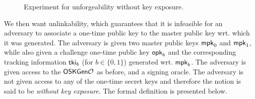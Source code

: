 \begin{figure}[!t]
    \centering
    \begin{pchstack}[boxed]
    \begin{pcvstack}
    

    \end{pcvstack}
    \pchspace
    
    \begin{pcvstack}
        
    \end{pcvstack}
    
    \end{pchstack}
    \caption{\small Experiment for unforgeability without key exposure.}
    \label{fig:experiment_forge_without_key_exposure}
\end{figure}

We then want unlinkability, which guarantees that it is infeasible for an adversary to associate a one-time public key to the master public key wrt. which it was generated.
The adversary is given two master public keys $\mathsf{mpk}_0$ and $\mathsf{mpk}_1$, while also given a challenge one-time public key $\mathsf{opk}_b$ and the corresponding tracking information $\mathsf{tki}_b$ (for $b \in \{ 0,1\}$) generated wrt. $\mathsf{mpk}_b$.
The adversary is given access to the $\mathsf{OSKGen}\mathcal{O}$ as before, and a signing oracle.
The adversary is not given access to any of the one-time secret keys and therefore the notion is said to be \emph{without key exposure}. The formal definition is presented below.

